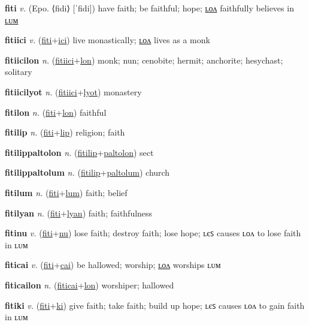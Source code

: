 \textbf{\hypertarget{fiti}{fiti}} \textit{v.} (Epo. ⟨fidi⟩ [ˈfidi])
have faith; be faithful; hope; \hyperlink{fitilon}{ʟᴏᴧ} faithfully believes in \hyperlink{fitilum}{ʟᴜᴍ}

\textbf{\hypertarget{fitiici}{fitiici}} \textit{v.} (\hyperlink{fiti}{fiti}+\allowbreak \hyperlink{ici}{ici})
live monastically; \hyperlink{fitiicilon}{ʟᴏᴧ} lives as a monk

\textbf{\hypertarget{fitiicilon}{fitiicilon}} \textit{n.} (\hyperlink{fitiici}{fitiici}+\allowbreak \hyperlink{lon}{lon})
monk; nun; cenobite; hermit; anchorite; hesychast; solitary

\textbf{\hypertarget{fitiicilyot}{fitiicilyot}} \textit{n.} (\hyperlink{fitiici}{fitiici}+\allowbreak \hyperlink{lyot}{lyot})
monastery

\textbf{\hypertarget{fitilon}{fitilon}} \textit{n.} (\hyperlink{fiti}{fiti}+\allowbreak \hyperlink{lon}{lon})
faithful

\textbf{\hypertarget{fitilip}{fitilip}} \textit{n.} (\hyperlink{fiti}{fiti}+\allowbreak \hyperlink{lip}{lip})
religion; faith

\textbf{\hypertarget{fitilippaltolon}{fitilippaltolon}} \textit{n.} (\hyperlink{fitilip}{fitilip}+\allowbreak \hyperlink{paltolon}{paltolon})
sect

\textbf{\hypertarget{fitilippaltolum}{fitilippaltolum}} \textit{n.} (\hyperlink{fitilip}{fitilip}+\allowbreak \hyperlink{paltolum}{paltolum})
church

\textbf{\hypertarget{fitilum}{fitilum}} \textit{n.} (\hyperlink{fiti}{fiti}+\allowbreak \hyperlink{lum}{lum})
faith; belief

\textbf{\hypertarget{fitilyan}{fitilyan}} \textit{n.} (\hyperlink{fiti}{fiti}+\allowbreak \hyperlink{lyan}{lyan})
faith; faithfulness

\textbf{\hypertarget{fitinu}{fitinu}} \textit{v.} (\hyperlink{fiti}{fiti}+\allowbreak \hyperlink{nu}{nu})
lose faith; destroy faith; lose hope; ʟєꜱ causes ʟᴏᴧ to lose faith in ʟᴜᴍ

\textbf{\hypertarget{fiticai}{fiticai}} \textit{v.} (\hyperlink{fiti}{fiti}+\allowbreak \hyperlink{cai}{cai})
be hallowed; worship; \hyperlink{fiticailon}{ʟᴏᴧ} worships ʟᴜᴍ

\textbf{\hypertarget{fiticailon}{fiticailon}} \textit{n.} (\hyperlink{fiticai}{fiticai}+\allowbreak \hyperlink{lon}{lon})
worshiper; hallowed

\textbf{\hypertarget{fitiki}{fitiki}} \textit{v.} (\hyperlink{fiti}{fiti}+\allowbreak \hyperlink{ki}{ki})
give faith; take faith; build up hope; ʟєꜱ causes ʟᴏᴧ to gain faith in ʟᴜᴍ

